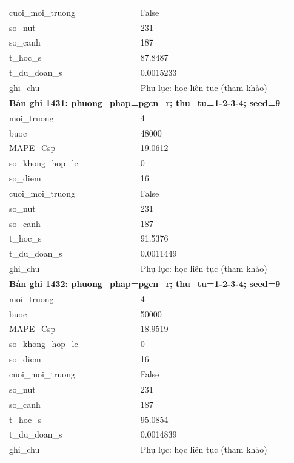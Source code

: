 \begin{longtable}{p{0.43\linewidth}p{0.50\linewidth}}
cuoi\_\allowbreak moi\_\allowbreak truong & False \\
so\_\allowbreak nut & 231 \\
so\_\allowbreak canh & 187 \\
t\_\allowbreak hoc\_\allowbreak s & 87.8487 \\
t\_\allowbreak du\_\allowbreak doan\_\allowbreak s & 0.0015233 \\
ghi\_\allowbreak chu & Phụ lục: học liên tục (tham khảo) \\
\midrule
\multicolumn{2}{p{0.95\linewidth}}{\textbf{Bản ghi 1431: phuong\_phap=pgcn\_r; thu\_tu=1-2-3-4; seed=9}} \\
moi\_\allowbreak truong & 4 \\
buoc & 48000 \\
MAPE\_\allowbreak Csp & 19.0612 \\
so\_\allowbreak khong\_\allowbreak hop\_\allowbreak le & 0 \\
so\_\allowbreak diem & 16 \\
cuoi\_\allowbreak moi\_\allowbreak truong & False \\
so\_\allowbreak nut & 231 \\
so\_\allowbreak canh & 187 \\
t\_\allowbreak hoc\_\allowbreak s & 91.5376 \\
t\_\allowbreak du\_\allowbreak doan\_\allowbreak s & 0.0011449 \\
ghi\_\allowbreak chu & Phụ lục: học liên tục (tham khảo) \\
\midrule
\multicolumn{2}{p{0.95\linewidth}}{\textbf{Bản ghi 1432: phuong\_phap=pgcn\_r; thu\_tu=1-2-3-4; seed=9}} \\
moi\_\allowbreak truong & 4 \\
buoc & 50000 \\
MAPE\_\allowbreak Csp & 18.9519 \\
so\_\allowbreak khong\_\allowbreak hop\_\allowbreak le & 0 \\
so\_\allowbreak diem & 16 \\
cuoi\_\allowbreak moi\_\allowbreak truong & False \\
so\_\allowbreak nut & 231 \\
so\_\allowbreak canh & 187 \\
t\_\allowbreak hoc\_\allowbreak s & 95.0854 \\
t\_\allowbreak du\_\allowbreak doan\_\allowbreak s & 0.0014839 \\
ghi\_\allowbreak chu & Phụ lục: học liên tục (tham khảo) \\

\end{longtable}
